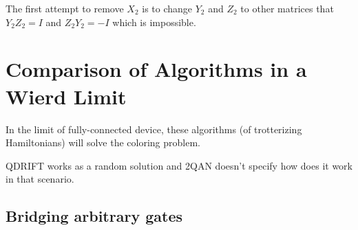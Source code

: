 \documentclass{report}
\begin{document}
The first attempt to remove $X_2$ is to change $Y_2$ and $Z_2$ to other matrices that $Y_2 Z_2 = I$ and $Z_2 Y_2 = -I$ which is impossible.



\clearpage

\section{Comparison of Algorithms in a Wierd Limit}

In the limit of fully-connected device, these algorithms (of trotterizing Hamiltonians) will solve the coloring problem.

QDRIFT works as a random solution and 2QAN doesn't specify how does it work in that scenario.


\clearpage






\subsection*{Bridging arbitrary gates}
\end{document}
